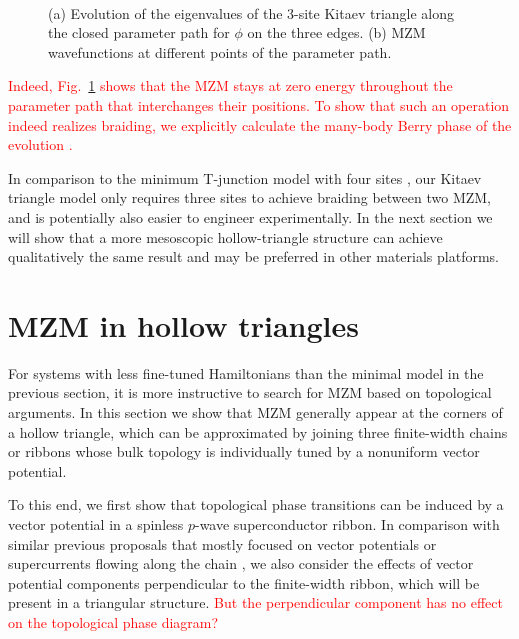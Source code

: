 \documentclass[aps,prb,showpacs,amsmath,twocolumn,amssymb,superscriptaddress]{revtex4-2}
\newcommand{\Red}[1]{\textcolor{red}{#1}}
\begin{document}
\begin{figure}[ht]
	\centering
	\\
	\caption{(a) Evolution of the eigenvalues of the 3-site Kitaev triangle along the closed parameter path for $\phi$ on the three edges. (b) MZM wavefunctions at different points of the parameter path.} 
	\label{fig:3eig}
\end{figure}

\Red{Indeed, Fig.~\ref{fig:3eig} shows that the MZM stays at zero energy throughout the parameter path that interchanges their positions. To show that such an operation indeed realizes braiding, we explicitly calculate the many-body Berry phase of the evolution \cite{aliceaNonAbelianStatisticsTopological2011,Li_2016}.}


In comparison to the minimum T-junction model with four sites \cite{aliceaNonAbelianStatisticsTopological2011}, our Kitaev triangle model only requires three sites to achieve braiding between two MZM, and is potentially also easier to engineer experimentally. In the next section we will show that a more mesoscopic hollow-triangle structure can achieve qualitatively the same result and may be preferred in other materials platforms.

\section{MZM in hollow triangles}
For systems with less fine-tuned Hamiltonians than the minimal model in the previous section, it is more instructive to search for MZM based on topological arguments. In this section we show that MZM generally appear at the corners of a hollow triangle, which can be approximated by joining three finite-width chains or ribbons whose bulk topology is individually tuned by a nonuniform vector potential. 

To this end, we first show that topological phase transitions can be induced by a vector potential in a spinless $p$-wave superconductor ribbon. In comparison with similar previous proposals that mostly focused on vector potentials or supercurrents flowing along the chain \cite{romitoManipulatingMajoranaFermions2012, takasanSupercurrentinducedTopologicalPhase2022}, we also consider the effects of vector potential components perpendicular to the finite-width ribbon, which will be present in a triangular structure. \Red{But the perpendicular component has no effect on the topological phase diagram?}
\end{document}
